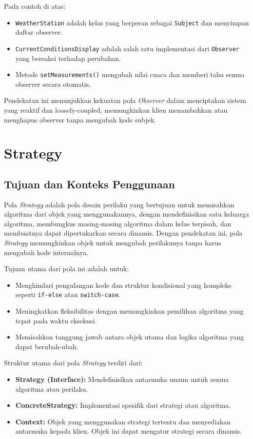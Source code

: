 Pada contoh di atas:
\begin{itemize}
	\item \texttt{WeatherStation} adalah kelas yang berperan sebagai \texttt{Subject} dan menyimpan daftar observer.
	\item \texttt{CurrentConditionsDisplay} adalah salah satu implementasi dari \texttt{Observer} yang bereaksi terhadap perubahan.
	\item Metode \texttt{setMeasurements()} mengubah nilai cuaca dan memberi tahu semua observer secara otomatis.
\end{itemize}

Pendekatan ini menunjukkan kekuatan pola \textit{Observer} dalam menciptakan sistem yang reaktif dan loosely-coupled, memungkinkan klien menambahkan atau menghapus observer tanpa mengubah kode subjek.


\section{Strategy}

\subsection{Tujuan dan Konteks Penggunaan}

Pola \textit{Strategy} adalah pola desain perilaku yang bertujuan untuk memisahkan algoritma dari objek yang menggunakannya, dengan mendefinisikan satu keluarga algoritma, membungkus masing-masing algoritma dalam kelas terpisah, dan membuatnya dapat dipertukarkan secara dinamis. Dengan pendekatan ini, pola \textit{Strategy} memungkinkan objek untuk mengubah perilakunya tanpa harus mengubah kode internalnya.

Tujuan utama dari pola ini adalah untuk:
\begin{itemize}
	\item Menghindari pengulangan kode dan struktur kondisional yang kompleks seperti \texttt{if-else} atau \texttt{switch-case}.
	\item Meningkatkan fleksibilitas dengan memungkinkan pemilihan algoritma yang tepat pada waktu eksekusi.
	\item Memisahkan tanggung jawab antara objek utama dan logika algoritma yang dapat berubah-ubah.
\end{itemize}

Struktur utama dari pola \textit{Strategy} terdiri dari:
\begin{itemize}
	\item \textbf{Strategy (Interface):} Mendefinisikan antarmuka umum untuk semua algoritma atau perilaku.
	\item \textbf{ConcreteStrategy:} Implementasi spesifik dari strategi atau algoritma.
	\item \textbf{Context:} Objek yang menggunakan strategi tertentu dan menyediakan antarmuka kepada klien. Objek ini dapat mengatur strategi secara dinamis.
\end{itemize}

